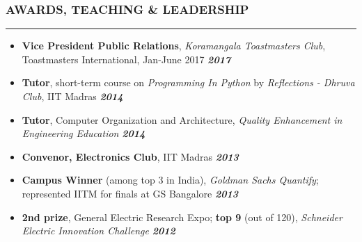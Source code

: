 \documentclass[10pt,a4paper,English]{article}
\newcommand\roottitle[1]{\vspace{-4mm}\subsubsection*{\uppercase{#1}}\vspace{-0.3em}\nopagebreak[4]\hrule\vspace{4mm}}
\newcommand\itemyear[1]{\hfill \textbf{\emph{\color{itemyear} #1}}}
\newcommand\itemenv{\setlength\itemsep{0.5pt} \addtolength{\itemindent}{-5mm}\vspace{-1.5mm}}
\begin{document}
\roottitle{Awards, Teaching \& Leadership}
\begin{itemize} \itemenv
    \item \textbf{Vice President Public Relations}, \textit{Koramangala Toastmasters Club}, Toastmasters International, Jan-June 2017 \itemyear{2017}
    \item \textbf{Tutor}, short-term course on \textit{Programming In Python} by \emph{Reflections - Dhruva Club}, IIT Madras \itemyear{2014}
    \item \textbf{Tutor}, Computer Organization and Architecture, \emph{Quality Enhancement in Engineering Education} \itemyear{2014}
    \item \textbf{Convenor, Electronics Club}, IIT Madras \itemyear{2013}
    \item \textbf{Campus Winner} (among top {3} in India), \textit{Goldman Sachs Quantify}; represented IITM for finals at GS Bangalore \itemyear{2013}
    \item \textbf{2nd prize}, General Electric Research Expo; \textbf{top 9} (out of 120), \textit{Schneider Electric Innovation Challenge} \itemyear{2012}
\end{itemize}
\end{document}
